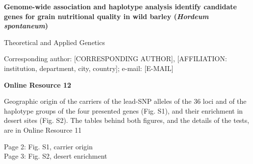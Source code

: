 \documentclass[10pt]{article}
\begin{document}
{\large\bfseries Genome-wide association and haplotype analysis identify candidate genes for grain nutritional quality in wild barley (\textit{Hordeum spontaneum})\par}\vspace{3mm}
Theoretical and Applied Genetics\par
[AUTHOR NAMES]\par
Corresponding author: [CORRESPONDING AUTHOR], [AFFILIATION: institution, department, city, country]; e-mail: [E-MAIL]\par\vspace{10mm}
{\large\bfseries Online Resource 12\par}\vspace{3mm}
Geographic origin of the carriers of the lead-SNP alleles of the 36 loci and of the haplotype groups of the four presented genes (Fig. S1), and their enrichment in desert sites (Fig. S2). The tables behind both figures, and the details of the tests, are in Online Resource 11\par\vspace{6mm}
{\small Page 2: Fig. S1, carrier origin\\ Page 3: Fig. S2, desert enrichment}
\end{document}
